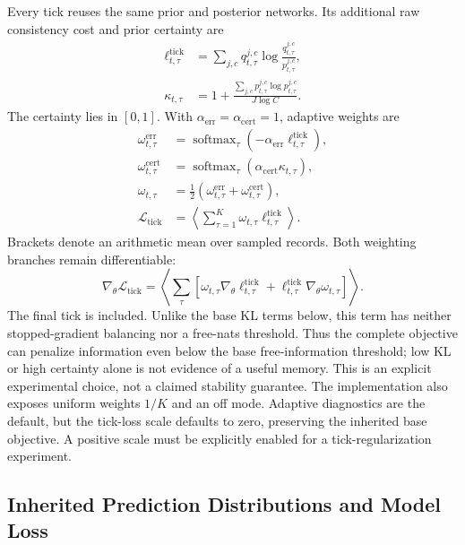\documentclass{article}
\begin{document}
Every tick reuses the same prior and posterior networks. Its additional raw consistency cost and prior certainty are
\begin{align}
\ell^{\mathrm{tick}}_{t,\tau}&=\sum_{j,c}q^{j,c}_{t,\tau}
\log\frac{q^{j,c}_{t,\tau}}{p^{j,c}_{t,\tau}},
\label{eq:tick_latent_cost}\\
\kappa_{t,\tau}&=1+\frac{\sum_{j,c}p^{j,c}_{t,\tau}\log p^{j,c}_{t,\tau}}{J\log C}.
\label{eq:tick_certainty}
\end{align}
The certainty lies in $[0,1]$. With $\alpha_{\mathrm{err}}=\alpha_{\mathrm{cert}}=1$, adaptive weights are
\begin{align}
\omega^{\mathrm{err}}_{t,\tau}&=\operatorname{softmax}_{\tau}(-\alpha_{\mathrm{err}}\ell^{\mathrm{tick}}_{t,\tau}),
\label{eq:error_tick_weight}\\
\omega^{\mathrm{cert}}_{t,\tau}&=\operatorname{softmax}_{\tau}(\alpha_{\mathrm{cert}}\kappa_{t,\tau}),
\label{eq:certainty_tick_weight}\\
\omega_{t,\tau}&=\tfrac12(\omega^{\mathrm{err}}_{t,\tau}+\omega^{\mathrm{cert}}_{t,\tau}),\\
\mathcal L_{\mathrm{tick}}&=\left\langle\sum_{\tau=1}^{K}\omega_{t,\tau}\ell^{\mathrm{tick}}_{t,\tau}\right\rangle.
\label{eq:nrsm_tick_loss}
\end{align}
Brackets denote an arithmetic mean over sampled records. Both weighting branches remain differentiable:
\begin{equation}
\nabla_\theta\mathcal L_{\mathrm{tick}}=
\left\langle\sum_\tau\left[
\omega_{t,\tau}\nabla_\theta\ell^{\mathrm{tick}}_{t,\tau}
+\ell^{\mathrm{tick}}_{t,\tau}\nabla_\theta\omega_{t,\tau}\right]\right\rangle.
\label{eq:credit_path}
\end{equation}
The final tick is included. Unlike the base KL terms below, this term has neither stopped-gradient balancing nor a free-nats threshold. Thus the complete objective can penalize information even below the base free-information threshold; low KL or high certainty alone is not evidence of a useful memory. This is an explicit experimental choice, not a claimed stability guarantee. The implementation also exposes uniform weights $1/K$ and an off mode. Adaptive diagnostics are the default, but the tick-loss scale defaults to zero, preserving the inherited base objective. A positive scale must be explicitly enabled for a tick-regularization experiment.

\subsection{Inherited Prediction Distributions and Model Loss}
\end{document}
